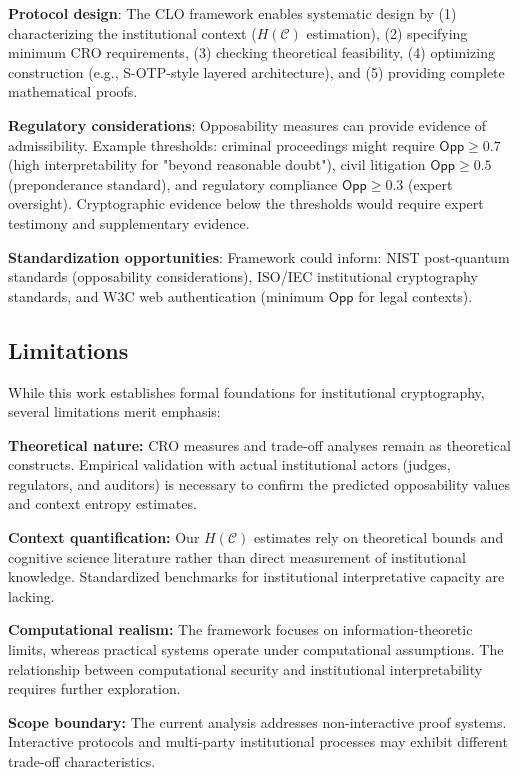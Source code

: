 \documentclass{ieeeaccess}
\begin{document}
\textbf{Protocol design}: The CLO framework enables systematic design by (1) characterizing the institutional context ($H(\mathcal{C})$ estimation), (2) specifying minimum CRO requirements, (3) checking theoretical feasibility, (4) optimizing construction (e.g., S-OTP-style layered architecture), and (5) providing complete mathematical proofs.

\textbf{Regulatory considerations}: Opposability measures can provide evidence of admissibility. Example thresholds: criminal proceedings might require $\mathsf{Opp} \geq 0.7$ (high interpretability for "beyond reasonable doubt"), civil litigation $\mathsf{Opp} \geq 0.5$ (preponderance standard), and regulatory compliance $\mathsf{Opp} \geq 0.3$ (expert oversight). Cryptographic evidence below the thresholds would require expert testimony and supplementary evidence.

\textbf{Standardization opportunities}: Framework could inform: NIST post-quantum standards (opposability considerations), ISO/IEC institutional cryptography standards, and W3C web authentication (minimum $\mathsf{Opp}$ for legal contexts).

\subsection{Limitations}\label{subsec:limitations}

While this work establishes formal foundations for institutional cryptography, several limitations merit emphasis:

\textbf{Theoretical nature:} CRO measures and trade-off analyses remain as theoretical constructs. Empirical validation with actual institutional actors (judges, regulators, and auditors) is necessary to confirm the predicted opposability values and context entropy estimates.

\textbf{Context quantification:} Our $H(\mathcal{C})$ estimates rely on theoretical bounds and cognitive science literature rather than direct measurement of institutional knowledge. Standardized benchmarks for institutional interpretative capacity are lacking.

\textbf{Computational realism:} The framework focuses on information-theoretic limits, whereas practical systems operate under computational assumptions. The relationship between computational security and institutional interpretability requires further exploration.

\textbf{Scope boundary:} The current analysis addresses non-interactive proof systems. Interactive protocols and multi-party institutional processes may exhibit different trade-off characteristics.
\end{document}

